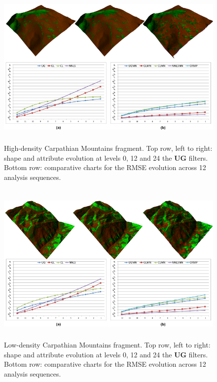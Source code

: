 \documentclass[graybox]{svmult}
\begin{document}
\begin{figure}[!htbp]
	\centering
	\includegraphics[height=8cm]{fundata_lod_rmse.pdf}
	
	\caption{\label{fig_cds:fundata_lod_rmse}%
		High-density Carpathian Mountains fragment.  Top row, left to right: shape and attribute evolution at levels 0, 12 and 24 the \textbf{UG} filters. Bottom row: comparative charts for the RMSE evolution across 12 analysis sequences. }
\end{figure}

\begin{figure}[!htbp]
	\centering
	\includegraphics[height=8cm]{iezer_lod_rmse.pdf}
	
	\caption{\label{fig_cds:iezer_lod_rmse}%
		Low-density Carpathian Mountains fragment.  Top row, left to right: shape and attribute evolution at levels 0, 12 and 24 the \textbf{UG} filters. Bottom row: comparative charts for the RMSE evolution across 12 analysis sequences. }
\end{figure}
\end{document}
